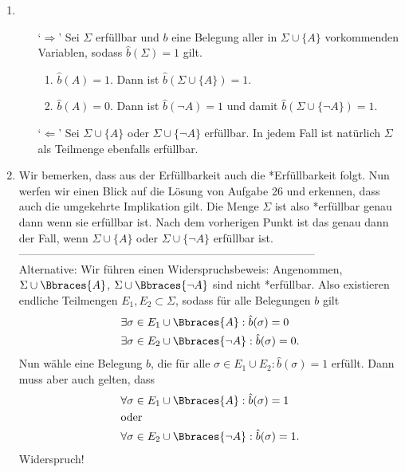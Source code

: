 \begin{solution}
\phantom{}
\begin{enumerate}
	\item
	\begin{enumerate}
		\item[`$\Rightarrow$']  Sei $\Sigma$ erfüllbar und $b$ eine Belegung aller in $\Sigma \cup \{A\}$ vorkommenden Variablen, sodass $\hat{b}(\Sigma) = 1$ gilt.
		\begin{enumerate}[label = Fall \arabic*:]
			\item $\hat{b}(A) = 1$. Dann ist $\hat{b}(\Sigma \cup \{A\}) =1$.
			\item $\hat{b}(A) = 0$. Dann ist $\hat{b}(\neg A) = 1$ und damit $\hat{b}(\Sigma \cup \{\neg A\}) =1$.
		\end{enumerate}
		\item[`$\Leftarrow$'] Sei $\Sigma \cup \{A\}$ oder $\Sigma \cup \{\neg A\}$ erfüllbar. In jedem Fall ist natürlich $\Sigma$ als Teilmenge ebenfalls erfüllbar.
	\end{enumerate}
	\item Wir bemerken, dass aus der Erfüllbarkeit auch die *Erfüllbarkeit folgt. Nun werfen wir einen Blick auf die Lösung von Aufgabe 26 und erkennen, dass auch die umgekehrte Implikation gilt. Die Menge $\Sigma$ ist also *erfüllbar genau dann wenn sie erfüllbar ist. Nach dem vorherigen Punkt ist das genau dann der Fall, wenn $\Sigma \cup \{A\}$ oder $\Sigma \cup \{\neg A\}$ erfüllbar ist. \\
  --------------------------------------------------------------------------------\\
  Alternative:
  Wir führen einen Widerspruchsbeweis:
  Angenommen, $\Sigma \cup \Bbraces{A}$, $\Sigma \cup \Bbraces{\neg A}$ sind nicht *erfüllbar.
  Also existieren endliche Teilmengen $E_1, E_2 \subset \Sigma$, sodass für alle Belegungen $b$ gilt
  \begin{align*}
    &\exists \sigma \in E_1 \cup \Bbraces{A}: \hat{b}(\sigma) = 0 \\
    &\exists \sigma \in E_2 \cup \Bbraces{\neg A}: \hat{b}(\sigma) = 0.
  \end{align*}
  Nun wähle eine Belegung $b$, die für alle $\sigma \in E_1 \cup  E_2: \hat{b}(\sigma) = 1$ erfüllt.
  Dann muss aber auch gelten, dass
  \begin{align*}
    &\forall \sigma \in E_1 \cup \Bbraces{A}: \hat{b}(\sigma) = 1 \\
    &\text{oder}\\
    &\forall \sigma \in E_2 \cup \Bbraces{\neg A}: \hat{b}(\sigma) = 1.
  \end{align*}
  Widerspruch!
\end{enumerate}

\end{solution}

